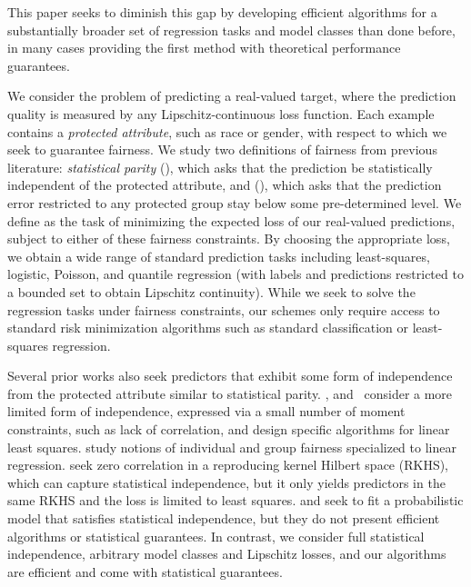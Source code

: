 \documentclass{article}
\begin{document}
This paper seeks to diminish this gap by developing efficient algorithms
for a substantially broader set of regression tasks and model classes than done before, in many cases
providing the first method with theoretical performance guarantees.

We consider the problem of predicting a real-valued target,
where the prediction quality is measured by any Lipschitz-continuous loss function. Each example contains a \emph{protected attribute}, such as race or gender, with respect to which we seek to guarantee fairness.
%
We study two definitions of fairness from previous literature: \emph{statistical parity} (\sp), which asks that the prediction be statistically independent of the protected attribute, and
\emph{\ep} (\epshort), which asks that the prediction error restricted to any protected group stay below some pre-determined level.
We define \prob as the task of minimizing the expected loss of our real-valued predictions, subject to either of these fairness constraints.
By choosing the appropriate loss, we obtain a wide range of standard prediction tasks including least-squares, logistic, Poisson, and quantile regression (with labels and predictions restricted to a bounded set to obtain Lipschitz continuity). While we seek to solve the regression tasks under fairness constraints, our schemes only require access to standard risk minimization algorithms such as standard classification or least-squares regression.

Several prior works also seek predictors that exhibit some form of independence from the protected attribute similar to statistical parity. %
\citet{CaldersEtAl13}, \citet{johnson2016impartial} and~\citet{komiyama2018nonconvex} consider a more limited form of independence, expressed via a small number of moment constraints, such as lack of correlation, and design specific algorithms for linear least squares. \citet{berk} study notions of individual and group fairness specialized to linear regression. \citet{perez2017fair} seek zero correlation in a reproducing kernel Hilbert space (RKHS), which can capture statistical independence,
but it only yields predictors in the same RKHS and the loss is limited to least squares. \citet{KamishimaEtAl12} and \citet{FukuchiEtAl13} seek to fit a probabilistic model that satisfies statistical independence, but they do not present efficient algorithms or statistical guarantees. In contrast, we consider full statistical independence, arbitrary model classes and Lipschitz losses, and our algorithms are efficient and come with statistical guarantees.
\end{document}

